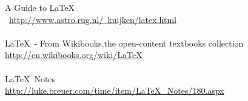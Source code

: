 

A Guide to \LaTeX\\\
\href{http://www.astro.rug.nl/~kuijken/latex.html}
{http://www.astro.rug.nl/~kuijken/latex.html}
\\
\\
\LaTeX\ - From Wikibooks,the open-content textbooks collection\\
\href{http://en.wikibooks.org/wiki/LaTeX}{http://en.wikibooks.org/wiki/LaTeX}
\\
\\
\LaTeX\ Notes\\
\href{http://luke.breuer.com/time/item/LaTeX\_Notes/180.aspx}{http://luke.breuer.com/time/item/LaTeX\_Notes/180.aspx}
